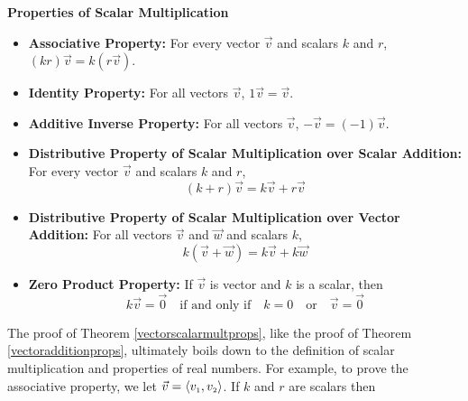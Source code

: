 \smallskip
\colorbox{ResultColor}{\bbm
\begin{thm}  \label{vectorscalarmultprops}\textbf{Properties of Scalar Multiplication}  

\begin{itemize}

\item  \textbf{Associative Property:}    For every  vector $\vec{v}$ and scalars  $k$ and $r$, $(kr)\vec{v} = k(r\vec{v})$.

\item  \textbf{Identity Property:}   For all vectors $\vec{v}$, $1\vec{v} = \vec{v}$.

\item  \textbf{Additive Inverse Property:} For all vectors $\vec{v}$, $-\vec{v} = (-1)\vec{v}$. 

\item  \textbf{Distributive Property of Scalar Multiplication over Scalar Addition:}    For every  vector $\vec{v}$ and scalars  $k$ and $r$, \[(k+r)\vec{v} = k\vec{v} + r\vec{v}\]

\item  \textbf{Distributive Property of Scalar Multiplication over Vector Addition:} For all vectors $\vec{v}$ and $\vec{w}$ and scalars $k$, \[k(\vec{v}+\vec{w}) = k\vec{v} + k\vec{w}\] 

\item  \textbf{Zero Product Property:}   If $\vec{v}$ is vector and $k$ is a scalar, then 
\[k\vec{v} = \vec{0} \quad \text{if and only if} \quad k=0 \quad \text{or} \quad \vec{v} =\vec{0}\]


\end{itemize}

\end{thm}
\ebm}
\smallskip

The proof of Theorem \ref{vectorscalarmultprops}, like the proof of Theorem \ref{vectoradditionprops}, ultimately boils down to the definition of scalar multiplication and properties of real numbers.  For example, to prove the associative property, we let $\vec{v} = \left<v_{\mbox{\tiny $1$}},v_{\mbox{\tiny $2$}}\right>$.  If $k$ and $r$ are scalars then 

